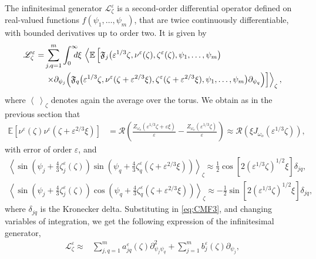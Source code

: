 \documentclass[final]{siamltex}
\begin{document}
The infinitesimal generator $\mathcal{L}_\zeta^{\varepsilon}$ is a second-order
differential operator defined on real-valued functions $f(\psi_1,
\ldots, \psi_m)$, that are twice continuously differentiable, with
bounded derivatives up to order two. It is given by 
\begin{align}
\mathscr{L}_\zeta^{\varepsilon} = &\sum_{j,q=1}^m \int_0^{\infty} \hspace{-0.1in}
d \xi \, \left< {\mathbb{E}} \left[ \mathfrak{F}_j\big({\varepsilon}^{1/3} \zeta,
  \nu^{\varepsilon}(\zeta),\zeta^{\varepsilon}(\zeta),\psi_1, \ldots, \psi_m\big)
  \right. \right. \nonumber\\ &\left. \left. \times \partial_{\psi_j} \Big(
  \mathfrak{F}_q\big({\varepsilon}^{1/3} \zeta, \nu^{\varepsilon}(\zeta + {\varepsilon}^{2/3}
  \xi),\zeta^{\varepsilon}(\zeta+{\varepsilon}^{2/3} \xi),\psi_1, \ldots,
  \psi_m\big)\partial_{\psi_q} \Big)
  \right]\right>_{\zeta}, \label{eq:CMF3}
\end{align}
where $\left< ~ \right>_\zeta$ denotes again the average over the torus.  
We obtain as in the previous section that
\begin{align*}
{\mathbb{E}} \left[\nu^{\varepsilon}(\zeta) \nu^{\varepsilon}(\zeta + {\varepsilon}^{2/3} \xi)\right]
&= {\mathcal{R}} \left(\frac{Z_{{\omega}_o}({\varepsilon}^{1/3} \zeta + {\varepsilon} \xi)}{\varepsilon} -
\frac{Z_{{\omega}_o}({\varepsilon}^{1/3} \zeta)}{\varepsilon} \right) \approx {\mathcal{R}}
\left(\xi J_{{\omega}_o}({\varepsilon}^{1/3}\zeta)\right),
\end{align*}
with error of order ${\varepsilon}$, and 
\begin{align*}
\left<\sin \left(\psi_j + \frac{4}{3}\zeta_j^{\varepsilon}(\zeta)\right)\sin
\left(\psi_q + \frac{4}{3} \zeta_q^{\varepsilon}(\zeta + {\varepsilon}^{2/3} \xi)\right)
\right>_\zeta \approx \frac{1}{2}\cos \left[ 2 \left({\varepsilon}^{1/3} \zeta
  \right)^{1/2} \xi\right] \delta_{jq}, \\ \left<\sin \left(\psi_j +
\frac{4}{3}\zeta_j^{\varepsilon}(\zeta)\right)\cos \left(\psi_q + \frac{4}{3}
\zeta_q^{\varepsilon}(\zeta + {\varepsilon}^{2/3} \xi)\right) \right>_\zeta \approx
-\frac{1}{2}\sin \left[ 2 \left({\varepsilon}^{1/3} \zeta \right)^{1/2}
  \xi\right] \delta_{jq},
\end{align*}
where $\delta_{jq}$ is the Kronecker delta. Substituting in
\eqref{eq:CMF3}, and changing variables of integration, we get the
following expression of the infinitesimal generator, 
\begin{align}
\mathscr{L}_\zeta^{\varepsilon} \approx &
\sum_{j,q=1}^m a_{jq}^{\varepsilon}(\zeta) \partial^2_{\psi_j \psi_q} +\sum_{j=1}^m b_{j}^{\varepsilon}(\zeta) \partial_{\psi_j} ,
\end{align}
\end{document}
